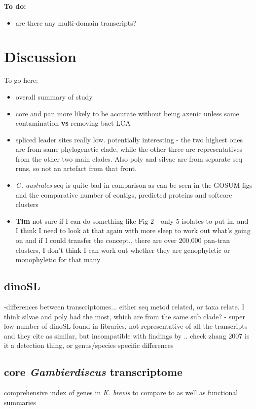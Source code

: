 \documentclass[12pt]{article}
\begin{document}
\textbf{To do:}
\begin{itemize}
\item are there any multi-domain  transcripts?
\end{itemize}

\section*{Discussion}
To go here:
\begin{itemize}
\item overall summary of study
\item core and pan more likely to be accurate without being axenic unless same contamination \textbf{vs} removing bact LCA
\item spliced leader sites really low. potentially interesting - the two highest ones are from same phylogenetic clade, while the other three are representatives from the other two main clades. Also poly and silvae are from separate seq runs, so not an artefact from that front.
\item \textit{G. australes} seq is quite bad in comparison as can be seen in the GOSUM figs and the comparative number of contigs, predicted proteins and softcore clusters
\item \textbf{Tim} not sure if I can do something like Fig 2 - only 5 isolates to put in, and I think I need to look at that again with more sleep to work out what's going on and if I could transfer the concept., there are over 200,000 pan-tran clusters, I don't think I can work out whether they are genophyletic or monophyletic for that many
\end{itemize}

\subsection{dinoSL}
-differences between transcriptomes... either seq metod related, or taxa relate. I think silvae and poly had the most, which are from the same sub clade?
- super low number of dinoSL found in libraries, not representative of all the transcripts \cite{guo2011spliced} and they cite \cite{bachvaroff2008stop} as similar, but incompatible with findings by \cite{zhang2009retrieval}.. check zhang 2007 is it a detection thing, or genus/species specific differences
\subsection*{core \textit{Gambierdiscus} transcriptome}
 \cite{lidie2005gene} comprehensive index of genes in \textit{K. brevis} to compare to as well as functional summaries 
\end{document}
